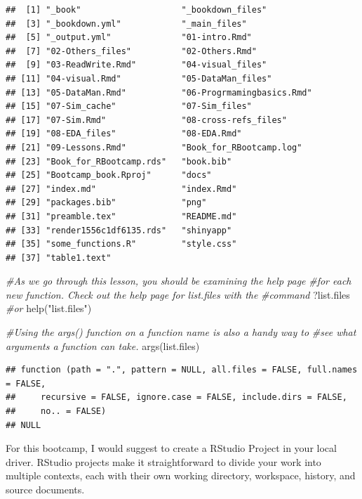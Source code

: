 \documentclass[
]{book}
\newenvironment{Shaded}{\begin{snugshade}}{\end{snugshade}}
\newcommand{\CommentTok}[1]{\textcolor[rgb]{0.56,0.35,0.01}{\textit{#1}}}
\newcommand{\FunctionTok}[1]{\textcolor[rgb]{0.00,0.00,0.00}{#1}}
\newcommand{\NormalTok}[1]{#1}
\newcommand{\StringTok}[1]{\textcolor[rgb]{0.31,0.60,0.02}{#1}}
\begin{document}
\begin{verbatim}
##  [1] "_book"                    "_bookdown_files"         
##  [3] "_bookdown.yml"            "_main_files"             
##  [5] "_output.yml"              "01-intro.Rmd"            
##  [7] "02-Others_files"          "02-Others.Rmd"           
##  [9] "03-ReadWrite.Rmd"         "04-visual_files"         
## [11] "04-visual.Rmd"            "05-DataMan_files"        
## [13] "05-DataMan.Rmd"           "06-Progrmamingbasics.Rmd"
## [15] "07-Sim_cache"             "07-Sim_files"            
## [17] "07-Sim.Rmd"               "08-cross-refs_files"     
## [19] "08-EDA_files"             "08-EDA.Rmd"              
## [21] "09-Lessons.Rmd"           "Book_for_RBootcamp.log"  
## [23] "Book_for_RBootcamp.rds"   "book.bib"                
## [25] "Bootcamp_book.Rproj"      "docs"                    
## [27] "index.md"                 "index.Rmd"               
## [29] "packages.bib"             "png"                     
## [31] "preamble.tex"             "README.md"               
## [33] "render1556c1df6135.rds"   "shinyapp"                
## [35] "some_functions.R"         "style.css"               
## [37] "table1.text"
\end{verbatim}

\begin{Shaded}
\begin{Highlighting}[]
\CommentTok{\#As we go through this lesson, you should be examining the help page }
\CommentTok{\#for each new function. Check out the help page for list.files with the}
\CommentTok{\#command}
\NormalTok{?list.files}
\CommentTok{\#or}
\FunctionTok{help}\NormalTok{(}\StringTok{"list.files"}\NormalTok{)}

\CommentTok{\#Using the args() function on a function name is also a handy way to }
\CommentTok{\#see what arguments a function can take.}
\FunctionTok{args}\NormalTok{(list.files)}
\end{Highlighting}
\end{Shaded}

\begin{verbatim}
## function (path = ".", pattern = NULL, all.files = FALSE, full.names = FALSE, 
##     recursive = FALSE, ignore.case = FALSE, include.dirs = FALSE, 
##     no.. = FALSE) 
## NULL
\end{verbatim}

For this bootcamp, I would suggest to create a RStudio Project in your local driver. RStudio projects make it straightforward to divide your work into multiple contexts, each with their own working directory, workspace, history, and source documents.
\end{document}
